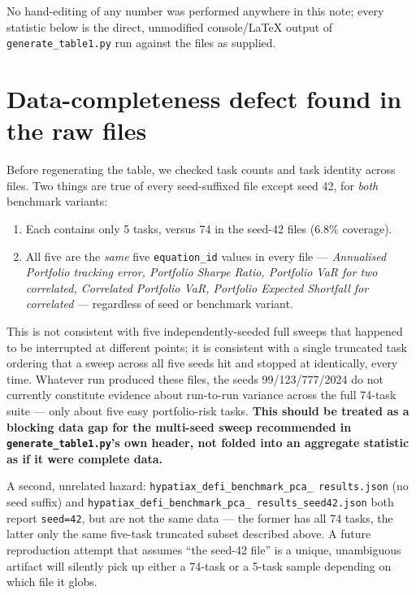 \documentclass{jmlr}
\begin{document}
No hand-editing of any number was performed anywhere in this note; every
statistic below is the direct, unmodified console/LaTeX output of
\texttt{generate\_table1.py} run against the files as supplied.

\section{Data-completeness defect found in the raw files}
\label{sec:completeness}

Before regenerating the table, we checked task counts and task identity
across files. Two things are true of every seed-suffixed file except
seed 42, for \emph{both} benchmark variants:

\begin{enumerate}
\item Each contains only 5 tasks, versus 74 in the seed-42 files
  (6.8\% coverage).
\item All five are the \emph{same} five \texttt{equation\_id} values in
  every file --- \textit{Annualised Portfolio tracking error, Portfolio
  Sharpe Ratio, Portfolio VaR for two correlated, Correlated Portfolio VaR,
  Portfolio Expected Shortfall for correlated} --- regardless of seed or
  benchmark variant.
\end{enumerate}

This is not consistent with five independently-seeded full sweeps that
happened to be interrupted at different points; it is consistent with a
single truncated task ordering that a sweep across all five seeds hit and
stopped at identically, every time. Whatever run produced these files, the
seeds 99/123/777/2024 do not currently constitute evidence about
run-to-run variance across the full 74-task suite --- only about five easy
portfolio-risk tasks. \textbf{This should be treated as a blocking data
gap for the multi-seed sweep recommended in \texttt{generate\_table1.py}'s
own header, not folded into an aggregate statistic as if it were complete
data.}

A second, unrelated hazard: \texttt{hypatiax\_defi\_benchmark\_pca\_
results.json} (no seed suffix) and \texttt{hypatiax\_defi\_benchmark\_pca\_
results\_seed42.json} both report \texttt{seed=42}, but are not the same
data --- the former has all 74 tasks, the latter only the same
five-task truncated subset described above. A future reproduction attempt
that assumes ``the seed-42 file'' is a unique, unambiguous artifact will
silently pick up either a 74-task or a 5-task sample depending on which
file it globs.
\end{document}
